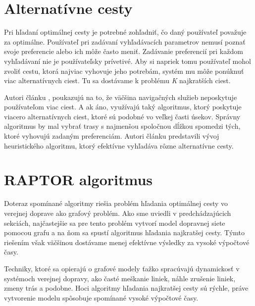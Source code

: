 \section{Alternatívne cesty}
\label{sec:alternative-optimal-paths}
Pri hľadaní optimálnej cesty je potrebné zohľadniť, čo daný používateľ považuje za optimálne. Používateľ pri zadávaní vyhľadávacích parametrov nemusí poznať svoje preferencie alebo ich môže často meniť. Zadávanie preferencií pri každom vyhľadávaní nie je používateľsky prívetivé. Aby si napriek tomu používateľ mohol zvoliť cestu, ktorá najviac vyhovuje jeho potrebám, systém mu môže ponúknuť viac alternatívnych ciest. Tu sa dostávame k problému \textit{K} najkratších ciest.

Autori článku \cite{dissimilar}, poukazujú na to, že väčšina navigačných služieb neposkytuje používateľom viac ciest. A ak áno, využívajú taký algoritmus, ktorý poskytuje viacero alternatívnych ciest, ktoré sú podobné vo veľkej časti úsekov. Správny algoritmus by mal vybrať trasy s najmenšou spoločnou dĺžkou spomedzi tých, ktoré vyhovujú zadaným preferenciám. Autori článku predstavili vývoj heuristického algoritmu, ktorý efektívne vyhľadáva rôzne alternatívne cesty. %


\section{RAPTOR algoritmus}
\label{sec:raptor}
Doteraz spomínané algoritmy riešia problém hľadania optimálnej cesty vo verejnej doprave ako grafový problém. Ako sme uviedli v predchádzajúcich sekciách, najčastejšie sa pre tento problém vytvorí model dopravnej siete pomocou grafu a na ňom sa spustí algoritmus hľadania najkratšej cesty. Týmto riešením však väčšinou dostávame menej efektívne výsledky za vysoké výpočtové časy.

Techniky, ktoré sa opierajú o grafové modely ťažko spracúvajú dynamickosť v systémoch verejnej dopravy, ako časté meškanie liniek, náhle zrušenie liniek, zmeny trás a podobne. Hoci algoritmy hľadania najkratšej cesty sú rýchle, práve vytvorenie modelu spôsobuje spomínané vysoké výpočtové časy.

